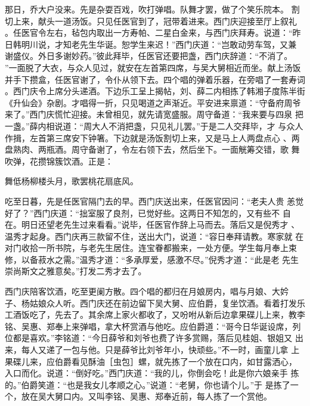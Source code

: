 那日，乔大户没来。先是杂耍百戏，吹打弹唱。队舞才罢，做了个笑乐院本。
割切上来，献头一道汤饭。只见任医官到了，冠带着进来。西门庆迎接至厅上叙礼
。任医官令左右，毡包内取出一方寿帕、二星白金来，与西门庆拜寿。说道：“昨
日韩明川说，才知老先生华诞。恕学生来迟！”西门庆道：“岂敢动劳车驾，又兼
谢盛仪。外日多谢妙药。”彼此拜毕，任医官还要把盏，西门庆辞道：“不消了。
”一面脱了大衣，与众人见过，就安在左首第四席，与吴大舅相近而坐。献上汤饭
并手下攒盒，任医官谢了，令仆从领下去。四个唱的弹着乐器，在旁唱了一套寿词
。西门庆令上席分头递酒。下边乐工呈上揭帖，刘、薛二内相拣了韩湘子度陈半街
《升仙会》杂剧。才唱得一折，只见喝道之声渐近。平安进来禀道：“守备府周爷
来了。”西门庆慌忙迎接。未曾相见，就先请宽盛服。周守备道：“我来要与四泉
把一盏。”薛内相说道：“周大人不消把盏，只见礼儿罢。”于是二人交拜毕，才
与众人作揖，左首第三席安下钟箸。下边就是汤饭割切上来，又是马上人两盘点心
、两盘熟肉、两瓶酒。周守备谢了，令左右领下去，然后坐下。一面觥筹交错，歌
舞吹弹，花攒锦簇饮酒。正是：

舞低杨柳楼头月，歌罢桃花扇底风。

吃至日暮，先是任医官隔门去的早。西门庆送出来，任医官因问：“老夫人贵
恙觉好了？”西门庆道：“拙室服了良剂，已觉好些。这两日不知怎的，又有些不
自在。明日还望老先生过来看看。”说毕，任医官作辞上马而去。落后又是倪秀才
、温秀才起身。西门庆再三款留不住，送出大门，说道：“容日奉拜请教。寒家就
在对门收拾一所书院，与老先生居住。连宝眷都搬来，一处方便。学生每月奉上束
修，以备菽水之需。”温秀才道：“多承厚爱，感激不尽。”倪秀才道：“此是老
先生崇尚斯文之雅意矣。”打发二秀才去了。

西门庆陪客饮酒，吃至更阑方散。四个唱的都归在月娘房内，唱与月娘、大妗
子、杨姑娘众人听。西门庆还在前边留下吴大舅、应伯爵，复坐饮酒。看着打发乐
工酒饭吃了，先去了。其余席上家火都收了，又吩咐从新后边拿果碟儿上来，教李
铭、吴惠、郑奉上来弹唱，拿大杯赏酒与他吃。应伯爵道：“哥今日华诞设席，列
位都是喜欢。”李铭道：“今日薛爷和刘爷也费了许多赏赐，落后见桂姐、银姐又
出来，每人又递了一包与他。只是薛爷比刘爷年小，快顽些。”不一时，画童儿拿
上果碟儿来，应伯爵看见酥油［虫包］螺，就先拣了一个放在口内，如甘露洒心，
入口而化。说道：“倒好吃。”西门庆道：“我的儿，你倒会吃！此是你六娘亲手
拣的。”伯爵笑道：“也是我女儿孝顺之心。”说道：“老舅，你也请个儿。”于
是拣了一个，放在吴大舅口内。又叫李铭、吴惠、郑奉近前，每人拣了一个赏他。

